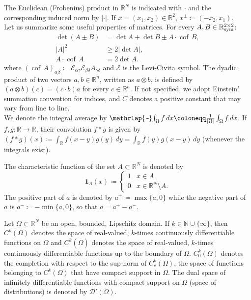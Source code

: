 \documentclass[a4, 11pt, reqno, final]{amsart}
\newcommand{\calD}{\mathcal{D}}
\newcommand{\calE}{\mathcal{E}}
\newcommand{\bbR}{\mathbb{R}}
\theoremstyle{plain}%
\DeclareMathOperator{\cof}{cof\,}
\DeclareMathOperator{\Sym}{\bbR^{2\times 2}_{\rm sym}}
\newcommand{\Rint}{\mathop{\mathrlap{\pushpv}}\!\int} %
\newcommand{\pushpv}{\mathchoice
	{\mkern5mu\rule[.6ex]{.5em}{1pt}}
	{\mkern2.8mu\rule[.5ex]{.35em}{.8pt}}
	{\mkern2.5mu\rule[.29ex]{.3em}{.7pt}}
	{\mkern2mu\rule[.2ex]{.2em}{.5pt}}}
\begin{document}
	The Euclidean (Frobenius) product in $\mathbb{R}^N$ is indicated with $\cdot$ and the corresponding induced norm by $|\cdot|$. If $x=(x_1,x_2) \in \bbR^2$, $x^\perp \coloneqq   (-x_2, x_1)$.\\
	Let us summarize some useful properties of matrices. For every $A,B \in \Sym$:
	\begin{equation}\label{eq:detAB}
		\begin{aligned}
			\det(A\pm B) &= \det A + \det B \pm  A \cdot \cof B,\\
			|A|^2 &\geq 2|\det A|,\\
			A\cdot\cof A &= 2\det A.
		\end{aligned}
	\end{equation}
	where
	$(\cof A)_{\alpha\beta} \coloneqq   \calE_{\alpha\gamma}\calE_{\beta\delta} A_{\gamma\delta}$ and $\calE$ is the Levi-Civita symbol.
	The dyadic product of two vectors $a,b \in \bbR^n$, written as  $a \otimes b$, is defined by $(a \otimes b)(c) = (c \cdot b) a$ for every $c \in \bbR^n$.
	If not specified, we adopt Einstein' summation convention for indices, and $C$ denotes a positive constant that may vary from line to line.\\
	We denote the integral average by $\Rint_\Omega f \, dx \coloneqq  \frac{1}{|\Omega|}\int_\Omega f \, dx$.
	If $f,g:\bbR \to \bbR$, their convolution $f\ast g$ is given by $(f\ast g)(x) \coloneqq  \int_\bbR f(x-y)g(y) \, dy = \int_\bbR f(y)g(x-y) \, dy$ (whenever the integrals exist).

	The characteristic function of the set $A\subset \bbR^N$ is denoted by
	$$ \mathbf{1}_A(x) \coloneqq   \begin{cases}
		1 & x \in A\\
		0 & x \in \bbR^N \setminus A.
	\end{cases}$$
	The positive part of $a$ is denoted by $a^+ \coloneqq  \max\{a,0\}$ while the negative part of $a$ is $a^- \coloneqq -\min\{a,0\}$, so that $a = a^+ - a^-$.

	Let $\Omega\subset \mathbb{R}^N$ be an open, bounded, Lipschitz domain. If $k\in \mathbb{N}\cup \{\infty\}$, then $C^k(\Omega)$ denotes the space of real-valued, $k$-times continuously differentiable functions on $\Omega$ and $C^k(\overline{\Omega})$ denotes the space of real-valued, $k$-times continuously differentiable functions up to the boundary of $\Omega$. $C_0^k(\Omega)$ denotes the completion with respect to the sup-norm of $C_c^k(\Omega)$, the space of functions belonging to $C^k(\Omega)$ that have compact support in $\Omega$. The dual space of infinitely differentiable functions with compact support on $\Omega$ (space of distributions) is denoted by $\calD'(\Omega)$.
\end{document}
